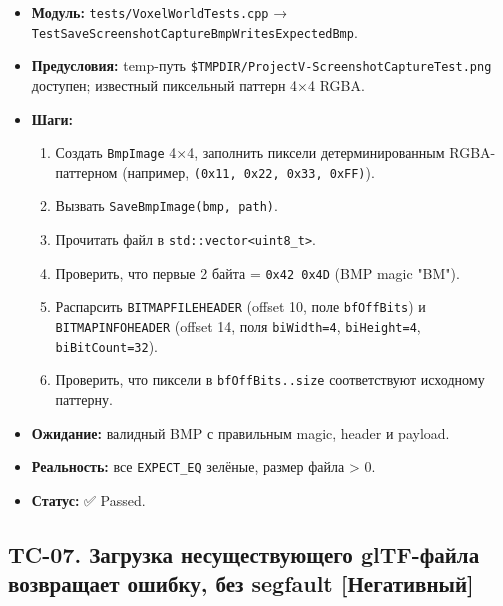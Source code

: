 \documentclass[
  11pt,a4paper,oneside]{article}
\providecommand{\tightlist}{%
  \setlength{\itemsep}{0pt}\setlength{\parskip}{0pt}}
\providecommand{\tightlist}{%
  \setlength{\itemsep}{0pt}\setlength{\parskip}{0pt}}
\begin{document}
\begin{itemize}
\tightlist
\item
  \textbf{Модуль:} \texttt{tests/VoxelWorldTests.cpp} → \texttt{TestSaveScreenshotCaptureBmpWritesExpectedBmp}.
\item
  \textbf{Предусловия:} temp-путь \texttt{\$TMPDIR/ProjectV-ScreenshotCaptureTest.png} доступен; известный пиксельный паттерн 4×4 RGBA.
\item
  \textbf{Шаги:}

  \begin{enumerate}
  \def\labelenumi{\arabic{enumi}.}
  \tightlist
  \item
    Создать \texttt{BmpImage} 4×4, заполнить пиксели детерминированным RGBA-паттерном (например, \texttt{(0x11,\ 0x22,\ 0x33,\ 0xFF)}).
  \item
    Вызвать \texttt{SaveBmpImage(bmp,\ path)}.
  \item
    Прочитать файл в \texttt{std::vector\textless{}uint8\_t\textgreater{}}.
  \item
    Проверить, что первые 2 байта = \texttt{0x42\ 0x4D} (BMP magic "BM").
  \item
    Распарсить \texttt{BITMAPFILEHEADER} (offset 10, поле \texttt{bfOffBits}) и \texttt{BITMAPINFOHEADER} (offset 14, поля \texttt{biWidth=4}, \texttt{biHeight=4}, \texttt{biBitCount=32}).
  \item
    Проверить, что пиксели в \texttt{bfOffBits..size} соответствуют исходному паттерну.
  \end{enumerate}
\item
  \textbf{Ожидание:} валидный BMP с правильным magic, header и payload.
\item
  \textbf{Реальность:} все \texttt{EXPECT\_EQ} зелёные, размер файла \textgreater{} 0.
\item
  \textbf{Статус:} ✅ Passed.
\end{itemize}

\subsection{TC-07. Загрузка несуществующего glTF-файла возвращает ошибку, без segfault {[}Негативный{]}}\label{tc-07-ux437ux430ux433ux440ux443ux437ux43aux430-ux43dux435ux441ux443ux449ux435ux441ux442ux432ux443ux44eux449ux435ux433ux43e-gltf-ux444ux430ux439ux43bux430-ux432ux43eux437ux432ux440ux430ux449ux430ux435ux442-ux43eux448ux438ux431ux43aux443-ux431ux435ux437-segfault-ux43dux435ux433ux430ux442ux438ux432ux43dux44bux439}
\end{document}
